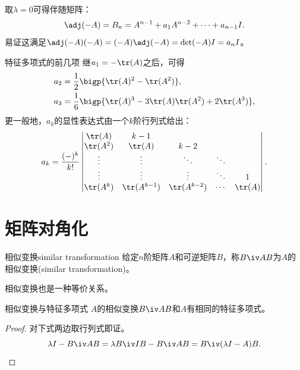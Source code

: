 \begin{corollary}
	取$\lambda=0$可得伴随矩阵：
	\begin{equation}
		\adj(-A)=B_n=A^{n-1}+a_1A^{n-2}+\cdots+a_{n-1}I.
	\end{equation}
	易证这满足$\adj(-A)(-A)=(-A)\adj(-A)=\det(-A)I=a_nI$。
\end{corollary}

\begin{example}
	{特征多项式的前几项}{}
	继$a_1=-\tr(A)$之后，可得
	\begin{subequations}
		\begin{align}
			a_2&=\frac12\bigp{\tr(A)^2-\tr(A^2)},\\
			a_3&=\frac16\bigp{\tr(A)^3-3\tr(A)\tr(A^2)+2\tr(A^3)},
		\end{align}
	\end{subequations}
	更一般地，$a_k$的显性表达式由一个$k$阶行列式给出：
	\begin{equation}
		a_k=\frac{(-)^k}{k!}\begin{vmatrix}
			\tr(A)&k-1\\
			\tr(A^2)&\tr(A)&k-2\\
			\vdots&\vdots&\ddots&\ddots\\
			\vdots&\vdots&\vdots&\ddots&1\\
			\tr(A^k)&\tr(A^{k-1})&\tr(A^{k-2})&\cdots&\tr(A)
		\end{vmatrix}.
	\end{equation}
\end{example}

\section{矩阵对角化}

\begin{definition}
	{相似变换}{similar transformation}
	给定$n$阶矩阵$A$和可逆矩阵$B$，称$B\iv AB$为$A$的相似变换(similar transformation)。
\end{definition}

\begin{corollary}
	相似变换也是一种等价关系。
\end{corollary}

\begin{theorem}{相似变换与特征多项式}{}
	$A$的相似变换$B\iv AB$和$A$有相同的特征多项式。
\end{theorem}
\begin{proof} 
	对下式两边取行列式即证。
	\[
		\lambda I-B\iv AB=\lambda B\iv IB-B\iv AB=B\iv(\lambda I-A)B.
		\qedhere
	\]
\end{proof}

